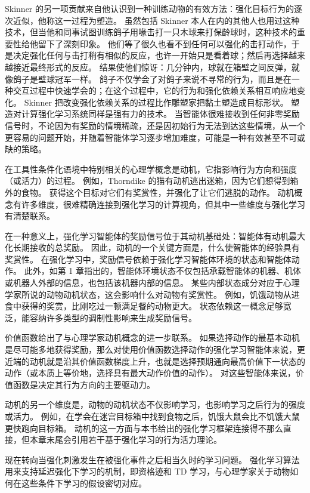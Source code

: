 \documentclass[UTF8,12pt,a4paper,fontset=fandol]{ctexart}
\begin{document}
Skinner 的另一项贡献来自他认识到一种训练动物的有效方法：强化目标行为的逐次近似，他称这一过程为塑造。
虽然包括 Skinner 本人在内的其他人也用过这种技术，但当他和同事试图训练鸽子用喙击打一只木球来打保龄球时，这种技术的重要性给他留下了深刻印象。
他们等了很久也看不到任何可以强化的击打动作，于是决定强化任何与击打稍有相似的反应，也许一开始只是看着球；然后再选择越来越接近最终形式的反应。
结果使他们惊讶：几分钟内，球就在箱壁之间反弹，就像鸽子是壁球冠军一样。
鸽子不仅学会了对鸽子来说不寻常的行为，而且是在一种交互过程中快速学会的；在这个过程中，它的行为和强化依赖关系相互响应地变化。
Skinner 把改变强化依赖关系的过程比作雕塑家把黏土塑造成目标形状。
塑造对计算强化学习系统同样是强有力的技术。
当智能体很难接收到任何非零奖励信号时，不论因为有奖励的情境稀疏，还是因初始行为无法到达这些情境，从一个更容易的问题开始，并随着智能体学习逐步增加难度，可能是一种有效甚至不可或缺的策略。

在工具性条件化语境中特别相关的心理学概念是动机，它指影响行为方向和强度（或活力）的过程。
例如，Thorndike 的猫有动机逃出迷箱，因为它们想得到箱外的食物。
获得这个目标对它们有奖赏性，并强化了让它们逃脱的动作。
动机概念有许多维度，很难精确连接到强化学习的计算视角，但其中一些维度与强化学习有清楚联系。

在一种意义上，强化学习智能体的奖励信号位于其动机基础处：智能体有动机最大化长期接收的总奖励。
因此，动机的一个关键方面是，什么使智能体的经验具有奖赏性。
在强化学习中，奖励信号依赖于强化学习智能体环境的状态和智能体动作。
此外，如第 1 章指出的，智能体环境状态不仅包括承载智能体的机器、机体或机器人外部的信息，也包括该机器内部的信息。
某些内部状态成分对应于心理学家所说的动物动机状态，这会影响什么对动物有奖赏性。
例如，饥饿动物从进食中获得的奖赏，比刚吃过一顿满足餐的动物更大。
状态依赖这一概念足够宽泛，能容纳许多类型的调制性影响来生成奖励信号。

价值函数给出了与心理学家动机概念的进一步联系。
如果选择动作的最基本动机是尽可能多地获得奖励，那么对使用价值函数选择动作的强化学习智能体来说，更近端的动机就是沿其价值函数梯度上升，也就是选择预期通向最高价值下一状态的动作（或本质上等价地，选择具有最大动作价值的动作）。
对这些智能体来说，价值函数是决定其行为方向的主要驱动力。

动机的另一个维度是，动物的动机状态不仅影响学习，也影响学习之后行为的强度或活力。
例如，在学会在迷宫目标箱中找到食物之后，饥饿大鼠会比不饥饿大鼠更快跑向目标箱。
动机的这一方面与本书给出的强化学习框架连接得不那么直接，但本章末尾会引用若干基于强化学习的行为活力理论。

现在转向当强化刺激发生在被强化事件之后相当久时的学习问题。
强化学习算法用来支持延迟强化下学习的机制，即资格迹和 TD 学习，与心理学家关于动物如何在这些条件下学习的假设密切对应。
\end{document}

